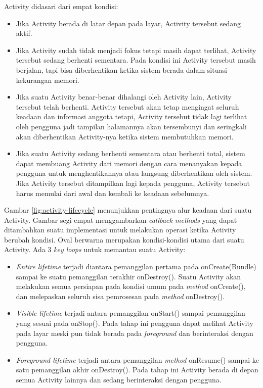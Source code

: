 Activity didasari dari empat kondisi:
\begin{itemize}
	\item Jika Activity berada di latar depan pada layar, Activity tersebut sedang aktif.
	\item Jika Activity sudah tidak menjadi fokus tetapi masih dapat terlihat, Activity tersebut sedang berhenti sementara. Pada kondisi ini Activity tersebut masih berjalan, tapi bisa diberhentikan ketika sistem berada dalam situasi kekurangan memori.
	\item Jika suatu Activity benar-benar dihalangi oleh Activity lain, Activity tersebut telah berhenti. Activity tersebut akan tetap mengingat seluruh keadaan dan informasi anggota tetapi, Activity tersebut tidak lagi terlihat oleh pengguna jadi tampilan halamannya akan tersembunyi dan seringkali akan diberhentikan Activity-nya ketika sistem membutuhkan memori.
	\item Jika suatu Activity sedang berhenti sementara atau berhenti total, sistem dapat membuang Activity dari memori dengan cara menanyakan kepada pengguna untuk menghentikannya atau langsung diberhentikan oleh sistem. Jika Activity tersebut ditampilkan lagi kepada pengguna, Activity tersebut harus memulai dari awal dan kembali ke keadaan sebelumnya.
\end{itemize}
Gambar \ref{fig:activity-lifecycle} menunjukkan pentingnya alur keadaan dari suatu Activity. Gambar segi empat menggambarkan \textit{callback \textit{method}s} yang dapat ditambahkan suatu implementasi untuk melakukan operasi ketika Activity berubah kondisi. Oval berwarna merupakan kondisi-kondisi utama dari suatu Activity.
Ada 3 \textit{key loops} untuk memantau suatu Activity:
\begin{itemize}
	\item \textit{Entire lifetime} terjadi diantara pemanggilan pertama pada onCreate(Bundle) sampai ke suatu pemanggilan terakhir onDestroy(). Suatu Activity akan melakukan semua persiapan pada kondisi umum pada \textit{method} onCreate(), dan melepaskan seluruh sisa pemrosesan pada \textit{method} onDestroy().
	\item \textit{Visible lifetime} terjadi antara pemanggilan onStart() sampai pemanggilan yang sesuai pada onStop(). Pada tahap ini pengguna dapat melihat Activity pada layar meski pun tidak berada pada \textit{foreground} dan berinteraksi dengan pengguna.
	\item \textit{Foreground lifetime} terjadi antara pemanggilan \textit{method} onResume() sampai ke satu pemanggilan akhir onDestroy(). Pada tahap ini Activity berada di depan semua Activity lainnya dan sedang berinteraksi dengan pengguna.
\end{itemize}


